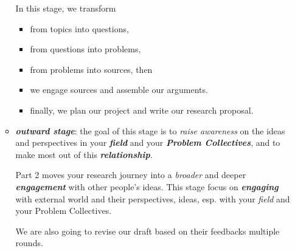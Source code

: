 \documentclass[11pt]{article}
\begin{document}
\begin{itemize}
\begin{itemize}
In this stage, we transform
\begin{itemize}
\item from topics into questions,
\item from questions into problems,
\item from problems into sources, then
\item we engage sources and assemble our arguments.
\item finally, we plan our project and write our research proposal.
\end{itemize}

\item \emph{\textbf{outward stage}}: the goal of this stage is to \emph{raise awareness} on the ideas and perspectives in your \emph{\textbf{field}} and your \emph{\textbf{Problem Collectives}}, and to make most out of this \emph{\textbf{relationship}}. 

Part 2 moves your research journey into a \emph{broader} and deeper \emph{\textbf{engagement}} with other people’s ideas.  This stage focus on \emph{\textbf{engaging}} with external world and their perspectives, ideas, esp. with your \emph{field} and your Problem Collectives. 

We are also going to revise our draft based on their feedbacks multiple rounds.
\end{itemize}
\end{itemize}
\end{document}
